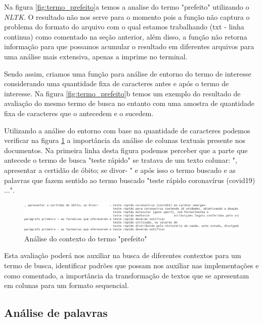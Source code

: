 \documentclass[10pt, a4paper]{article}
\begin{document}
Na figura  \ref{fig:termo_prefeito}a temos a analise do termo "prefeito" utilizando o \textit{NLTK}. O resultado não nos serve para o momento pois a função não captura o problema do formato do arquivo com o qual estamos trabalhando (txt - linha continua) como comentado na seção anterior, além disso, a função não retorna informação para que possamos acumular o resultado em diferentes arquivos para uma análise mais extensiva, apenas a imprime no terminal.

Sendo assim, criamos uma função para análise de entorno do termo de interesse considerando uma quantidade fixa de caracteres antes e após o termo de interesse. Na figura \ref{fig:termo_prefeito}b temos um exemplo do resultado de avaliação do mesmo termo de busca no entanto com uma amostra de quantidade fixa de caracteres que o antecedem e o sucedem.

Utilizando a análise do entorno com base na quantidade de caracteres podemos verificar na figura \ref{fig:termo_teste_rapido} a importância da análise de colunas textuais presente nos documentos. Na primeira linha desta figura podemos perceber que a parte que antecede o termo de busca "teste rápido" se tratava de um texto colunar: ", apresentar a certidão de óbito; se divor-    " e após isso o termo buscado e as palavras que fazem sentido ao termo buscado "teste rápido coronavírus (covid19) ...".


\begin{figure}[H]
    \centering
    \includegraphics[width=\linewidth]{images/prints/concordance_teste_rapido.png}
    \caption{Análise do contexto do termo "prefeito"}
    \label{fig:termo_teste_rapido}
\end{figure}

Esta avaliação poderá nos auxiliar na busca de diferentes contextos para um termo de busca, identificar padrões que possam nos auxiliar nas implementações e como comentado, a importância da transformação de textos que se apresentam em colunas para um formato sequencial.

\subsection{Análise de palavras}
\end{document}
